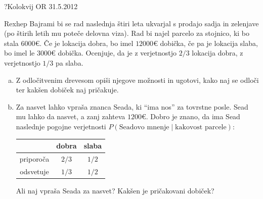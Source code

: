\begin{naloga}{?}{Kolokvij OR 31.5.2012}
\begin{vprasanje}[rexhep]
Rexhep Bajrami bi se rad naslednja štiri leta
ukvarjal s prodajo sadja in zelenjave
(po štirih letih mu poteče delovna viza).
Rad bi najel parcelo za stojnico, ki bo stala $6000 €$.
Če je lokacija dobra, bo imel $12000 €$ dobička,
če pa je lokacija slaba, bo imel le $3000 €$ dobička.
Ocenjuje, da je z verjetnostjo $2/3$ lokacija dobra,
z verjetnostjo $1/3$ pa slaba.
\begin{enumerate}[(a)]
\item Z odločitvenim drevesom opiši njegove možnosti in ugotovi,
kako naj se odloči ter kakšen dobiček naj pričakuje.
\item Za nasvet lahko vpraša znanca Seada, ki ``ima nos'' za tovrstne posle.
Sead mu lahko da nasvet, a zanj zahteva $1200 €$.
Dobro je znano, da ima Sead naslednje pogojne verjetnosti
$P(\text{Seadovo mnenje} \; | \; \text{kakovost parcele})$:
\begin{center}
\begin{tabular}{c|cc}
& dobra & slaba \\
\hline
priporoča & $2/3$ & $1/2$ \\
odsvetuje & $1/3$ & $1/2$
\end{tabular}
\end{center}
Ali naj vpraša Seada za nasvet?
Kakšen je pričakovani dobiček?
\end{enumerate}
\end{vprasanje}
\begin{odgovor}
\end{odgovor}
\end{naloga}


